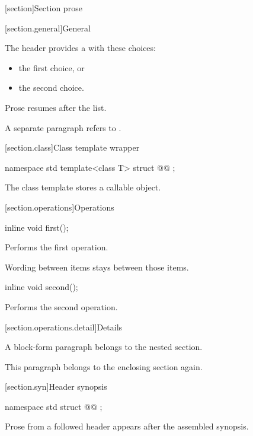 [section]{Section prose}

[section.general]{General}

\pnum
The header provides a  with these choices:
\begin{itemize}
\item the first choice, or
\item the second choice.
\end{itemize}
Prose resumes after the list.

\pnum
A separate paragraph refers to .

[section.class]{Class template wrapper}

\begin{codeblock}
namespace std {
  template<class T>
  struct @@ {};
}
\end{codeblock}

\pnum
The  class template stores a callable object.

[section.operations]{Operations}

%
\begin{itemdecl}
inline void first();
\end{itemdecl}

\begin{itemdescr}
\pnum
\effects
Performs the first operation.
\end{itemdescr}

\pnum
Wording between items stays between those items.

%
\begin{itemdecl}
inline void second();
\end{itemdecl}

\begin{itemdescr}
\pnum
\effects
Performs the second operation.
\end{itemdescr}

[section.operations.detail]{Details}

\pnum
A block-form paragraph belongs to the nested section.

\pnum
This paragraph belongs to the enclosing section again.

[section.syn]{Header synopsis}

\begin{codeblock}
namespace std {
  struct @@ {};
}
\end{codeblock}

\pnum
Prose from a followed header appears after the assembled synopsis.
